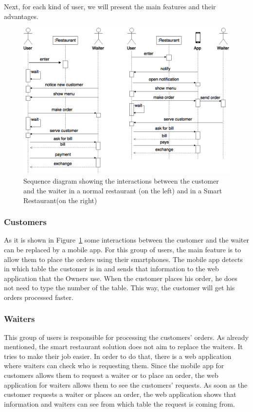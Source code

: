 Next, for each kind of user, we will present the main features and their
advantages.

\begin{figure}[!ht]
  \centering
    \includegraphics[width=1\textwidth]{figures/smart-restaurant}
    \caption{Sequence diagram showing the interactions between
    the customer and the waiter in a normal restaurant (on the left)
    and in a Smart Restaurant(on the right)}
    \label{fig:smart_restaurant}
\end{figure}

\subsubsection{Customers}
\label{sub:customers}
As it is shown in Figure~\ref{fig:smart_restaurant} some interactions between
the customer and the waiter can be replaced by a mobile app.
For this group of users, the main feature is to allow them to place
the orders using their smartphones. The mobile app detects in which table
the customer is in and sends that information to the web application that the
Owners use. When the customer places his order, he does not need to type
the number of the table. This way, the customer will get his orders
processed faster.

\subsubsection{Waiters}
\label{sub:waiters}
This group of users is responsible for processing the customers' orders.
As already mentioned, the smart restaurant solution does not aim to replace
the waiters. It tries to make their job easier. In order to do that,
there is a web application where waiters can check who is requesting them.
Since the mobile app for customers allows them to request a waiter or to place
an order, the web application for waiters allows them to see the customers'
requests. As soon as the customer requests a waiter or places an order,
the web application shows that information and waiters can see from which
table the request is coming from.

